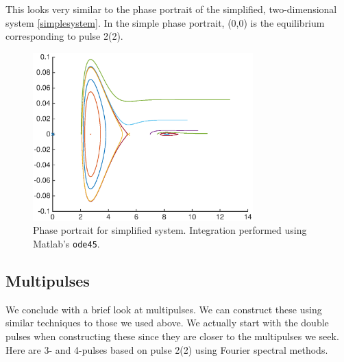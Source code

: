 \documentclass[12pt]{article}
\begin{document}
This looks very similar to the phase portrait of the simplified, two-dimensional system \eqref{simplesystem}. In the simple phase portrait, (0,0) is the equilibrium corresponding to pulse 2(2). 

\begin{figure}[H]
	\includegraphics[width=8.5cm]{simplephaseportrait}
	\caption{Phase portrait for simplified system. Integration performed using Matlab's \texttt{ode45}.}
\end{figure}

\subsection{Multipulses}

We conclude with a brief look at multipulses. We can construct these using similar techniques to those we used above. We actually start with the double pulses when constructing these since they are closer to the multipulses we seek. Here are 3- and 4-pulses based on pulse 2(2) using Fourier spectral methods.
\end{document}
